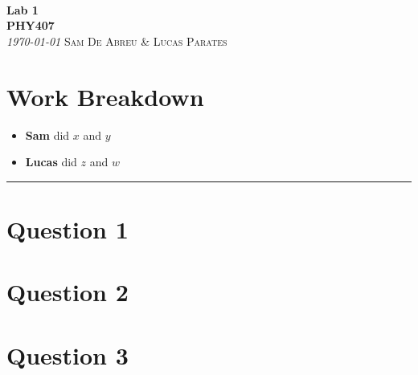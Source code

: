\documentclass[11pt]{article}
\newcommand{\CourseDef}{PHY407} %
\newcommand{\TitleDef}{Lab 1} %
\newcommand{\AuthorDef}{Sam De Abreu \& Lucas Parates} %
\begin{document}
\thispagestyle{plain}
{\noindent\Huge\bf  \\[0.5\baselineskip] {\selectfont  \TitleDef}         }\\[2\baselineskip] %
{ {\bf {}\selectfont \CourseDef}\\ {\textit{\selectfont     \today}}}\hspace{150pt}    {\large \textsc{\AuthorDef}} %
\\[1.4\baselineskip]
\vspace{15pt}

\section*{Work Breakdown}
\begin{itemize}
    \item \textbf{Sam} did $x$ and $y$
    \item \textbf{Lucas} did $z$ and $w$
\end{itemize}
\noindent\rule{\textwidth}{1pt}

\section*{Question 1}

\section*{Question 2}

\section*{Question 3}
\end{document}
